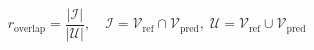 \documentclass[11pt]{article}
\begin{document}
\begin{equation*}
r_{\text{overlap}} = \frac{|\mathcal{I}|}{|\mathcal{U}|}, \quad \mathcal{I} = \mathcal{V}_{\text{ref}} \cap \mathcal{V}_{\text{pred}},\; \mathcal{U} = \mathcal{V}_{\text{ref}} \cup \mathcal{V}_{\text{pred}}\tag{8}
\end{equation*}
\end{document}
